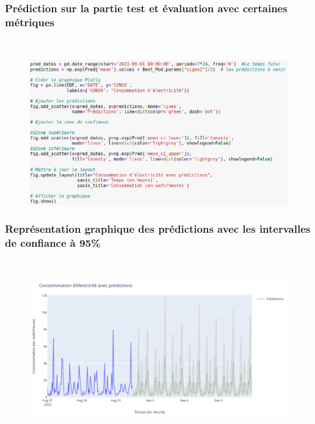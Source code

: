 \documentclass{beamer}
\theoremstyle{definition}
\begin{document}
\begin{frame}
	\frametitle{Prédiction sur la partie test et évaluation avec certaines métriques}
	\begin{minipage}[t]{1\linewidth}
		\centering\hfill\\[-0.5cm]
		\begin{figure}	
			\includegraphics[width=1\linewidth]{35.png}	
			\caption*{}
			
		\end{figure}
	\end{minipage}	
\end{frame}

\begin{frame}
	\frametitle{Représentation graphique des prédictions avec les intervalles de confiance à 95\%}
	\begin{minipage}[t]{1.03\linewidth}
		\centering\hfill\\[-0.5cm]
		\begin{figure}	
			\includegraphics[width=1\linewidth]{36.png}	
			\caption*{}
			
		\end{figure}
	\end{minipage}	
\end{frame}
\end{document}
